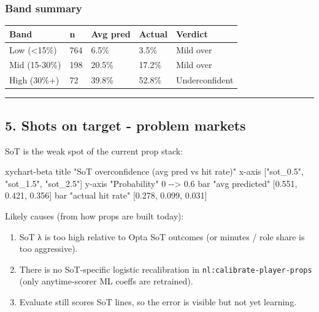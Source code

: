 \documentclass[
]{article}
\newenvironment{Shaded}{\begin{snugshade}}{\end{snugshade}}
\newcommand{\NormalTok}[1]{#1}
\newcounter{none} %
\providecommand{\tightlist}{%
  \setlength{\itemsep}{0pt}\setlength{\parskip}{0pt}}
\begin{document}
\subsubsection{Band summary}\label{band-summary}

{\def\LTcaptype{none} %
\begin{longtable}[]{@{}lllll@{}}
\toprule\noalign{}
Band & n & Avg pred & Actual & Verdict \\
\midrule\noalign{}
\endhead
\bottomrule\noalign{}
\endlastfoot
Low (\textless15\%) & 764 & 6.5\% & 3.5\% & Mild over \\
Mid (15-30\%) & 198 & 20.5\% & 17.2\% & Mild over \\
High (30\%+) & 72 & 39.8\% & 52.8\% & Underconfident \\
\end{longtable}
}

\begin{center}\rule{0.5\linewidth}{0.5pt}\end{center}

\subsection{5. Shots on target - problem
markets}\label{shots-on-target---problem-markets}

SoT is the weak spot of the current prop stack:

\begin{Shaded}
\begin{Highlighting}[]
\NormalTok{xychart{-}beta}
\NormalTok{  title "SoT overconfidence (avg pred vs hit rate)"}
\NormalTok{  x{-}axis ["sot\_0.5", "sot\_1.5", "sot\_2.5"]}
\NormalTok{  y{-}axis "Probability" 0 {-}{-}\textgreater{} 0.6}
\NormalTok{  bar "avg predicted" [0.551, 0.421, 0.356]}
\NormalTok{  bar "actual hit rate" [0.278, 0.099, 0.031]}
\end{Highlighting}
\end{Shaded}

Likely causes (from how props are built today):

\begin{enumerate}
\def\labelenumi{\arabic{enumi}.}
\tightlist
\item
  SoT λ is too high relative to Opta SoT outcomes (or minutes / role
  share is too aggressive).
\item
  There is no SoT-specific logistic recalibration in
  \texttt{nl:calibrate-player-props} (only anytime-scorer ML coeffs are
  retrained).
\item
  Evaluate still scores SoT lines, so the error is visible but not yet
  learning.
\end{enumerate}
\end{document}
